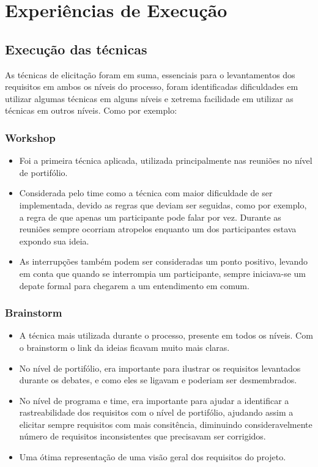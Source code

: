 \chapter[Experiências de Execução]{Experiências de Execução}

\section{Execução das técnicas}

As técnicas de elicitação foram em suma, essenciais para o levantamentos dos requisitos
em ambos os  níveis do processo, foram identificadas dificuldades em utilizar algumas
técnicas em alguns níveis e xetrema facilidade em utilizar as técnicas em outros níveis.
Como por exemplo:

\subsection{Workshop}
\begin{itemize}
  \item Foi a primeira técnica aplicada, utilizada principalmente nas reuniões no nível de portifólio.
  \item Considerada pelo time como a técnica com maior dificuldade de ser implementada, devido as regras que deviam ser seguidas, como por exemplo, a regra de que apenas um participante pode falar por vez. Durante as reuniões sempre ocorriam atropelos enquanto um dos participantes estava expondo sua ideia.
  \item As interrupções também podem ser consideradas um ponto positivo, levando em conta que quando se interrompia um participante, sempre iniciava-se um depate formal para chegarem a um entendimento em comum.
\end{itemize}

\subsection{Brainstorm}
\begin{itemize}
\item A técnica mais utilizada durante o processo, presente em todos os níveis. Com o brainstorm o link da ideias ficavam muito mais claras.
\item No nível de portifólio, era importante para ilustrar os requisitos levantados durante os debates, e como eles se ligavam e poderiam ser desmembrados.
\item No nível de programa e time, era importante para ajudar a identificar a rastreabilidade dos requisitos com o nível de portifólio, ajudando assim a elicitar sempre requisitos com mais consitência, diminuindo consideravelmente número de requisitos inconsistentes que precisavam ser corrigidos.
\item Uma ótima representação de uma visão geral dos requisitos do projeto.
\end{itemize}

